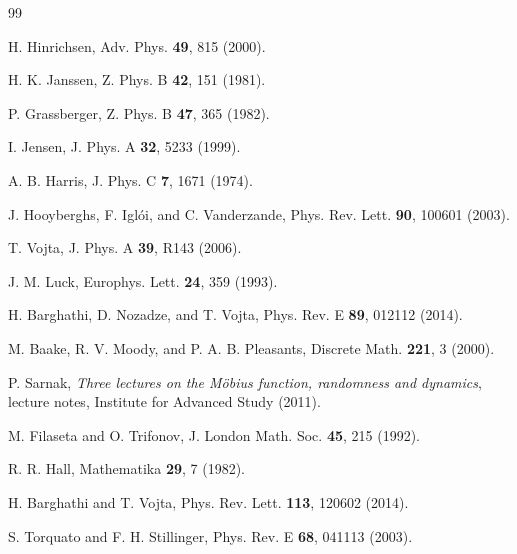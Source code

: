 \documentclass[aps,pre,twocolumn,superscriptaddress,nofootinbib]{revtex4-2}
\begin{document}
\begin{thebibliography}{99}

 H. Hinrichsen, Adv. Phys. \textbf{49}, 815 (2000).

 H. K. Janssen, Z. Phys. B \textbf{42}, 151 (1981).

 P. Grassberger, Z. Phys. B \textbf{47}, 365 (1982).

 I. Jensen, J. Phys. A \textbf{32}, 5233 (1999).

 A. B. Harris, J. Phys. C \textbf{7}, 1671 (1974).

 J. Hooyberghs, F. Igl\'oi, and C. Vanderzande, Phys. Rev. Lett.
\textbf{90}, 100601 (2003).

 T. Vojta, J. Phys. A \textbf{39}, R143 (2006).

 J. M. Luck, Europhys. Lett. \textbf{24}, 359 (1993).

 H. Barghathi, D. Nozadze, and T. Vojta, Phys. Rev. E
\textbf{89}, 012112 (2014).

 M. Baake, R. V. Moody, and P. A. B. Pleasants, Discrete
Math. \textbf{221}, 3 (2000).

 P. Sarnak, \emph{Three lectures on the M\"obius function, randomness
and dynamics}, lecture notes, Institute for Advanced Study (2011).

 M. Filaseta and O. Trifonov, J. London Math. Soc.
\textbf{45}, 215 (1992).

 R. R. Hall, Mathematika \textbf{29}, 7 (1982).

 H. Barghathi and T. Vojta, Phys. Rev. Lett. \textbf{113},
120602 (2014).

 S. Torquato and F. H. Stillinger, Phys. Rev. E
\textbf{68}, 041113 (2003).

\end{thebibliography}
\end{document}
